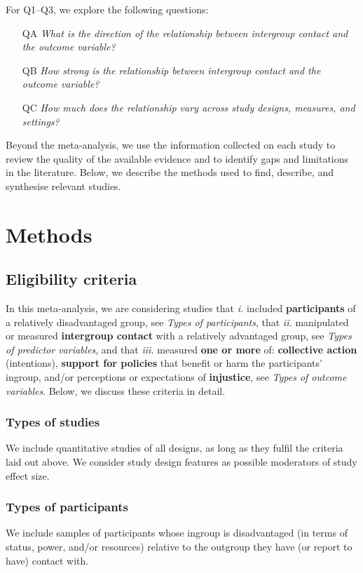 \documentclass[10pt, a4paper]{article}
\begin{document}
\noindent For Q1--Q3, we explore the following questions:

\begin{enumerate}
\item [QA]	\emph{What is the direction of the relationship between intergroup contact and the outcome variable?}
\item [QB]	\emph{How strong is the relationship between intergroup contact and the outcome variable?}
\item [QC]	\emph{How much does the relationship vary across study designs, measures, and settings?}
\end{enumerate}

\noindent Beyond the meta-analysis, we use the information collected on each study to review the quality of the available evidence and to identify gaps and limitations in the literature. Below, we describe the methods used to find, describe, and synthesise relevant studies.

\section{Methods}

\subsection{Eligibility criteria}
\label{sec:eligibility-criteria}

In this meta-analysis, we are considering studies that \textit{i.} included \textbf{participants} of a relatively disadvantaged group, see \emph{Types of participants}, that \textit{ii.} manipulated or measured \textbf{intergroup contact} with a relatively advantaged group, see \emph{Types of predictor variables}, and that \textit{iii.} measured \textbf{one or more} of: \textbf{collective action} (intentions), \textbf{support for policies} that benefit or harm the participants' ingroup, and/or perceptions or expectations of \textbf{injustice}, see \emph{Types of outcome variables}. Below, we discuss these criteria in detail.

\subsubsection{Types of studies}
We include quantitative studies of all designs, as long as they fulfil the criteria laid out above. We consider study design features as possible moderators of study effect size.

\subsubsection{Types of participants}
We include samples of participants whose ingroup is disadvantaged (in terms of status, power, and/or resources) relative to the outgroup they have (or report to have) contact with.
\end{document}
